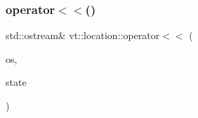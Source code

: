 \mbox{\label{namespacevt_1_1location_ae2016d077f335128b8f35b0b2c547c9e}} 
\subsubsection{\texorpdfstring{operator$<$$<$()}{operator<<()}\hspace{0.1cm}{\footnotesize\ttfamily [2/2]}}
{\footnotesize\ttfamily std\+::ostream\& vt\+::location\+::operator$<$$<$ (\begin{DoxyParamCaption}\item[{std\+::ostream \&}]{os,  }\item[{\hyperlink{namespacevt_1_1location_a7a5c74aad68cf57281515029d8521547}{e\+Loc\+State} const \&}]{state }\end{DoxyParamCaption})\hspace{0.3cm}{\ttfamily [inline]}}

